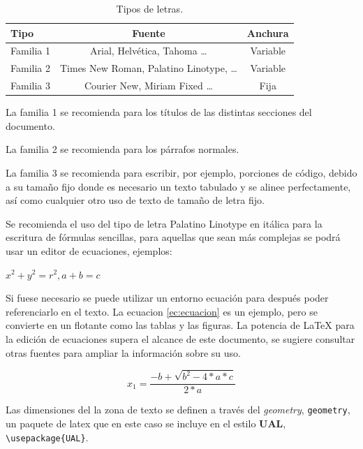 \begin{table} 
	\begin{center}
	\begin{tabular}{l c c}
		\textbf{Tipo} & \textbf{Fuente} & \textbf{Anchura} \\ \hline
         Familia 1 & Arial, Helvética, Tahoma  	\ldots & Variable \\
         Familia 2 & Times New Roman, Palatino  Linotype,  	\ldots & Variable  \\
         Familia 3 & Courier  New,  Miriam Fixed \ldots & Fija \\
         \hline
	\end{tabular}
	\end{center}

	\caption{\label{tab:letras}Tipos de letras.}
\end{table}


La familia 1 se recomienda para los títulos de las distintas secciones del documento.

La familia 2 se recomienda para los párrafos normales.

La familia 3 se recomienda para escribir, por ejemplo, porciones de código, debido a su tamaño fijo donde es necesario un texto tabulado y se alinee perfectamente, así como cualquier otro uso de texto de tamaño de letra fijo.

Se recomienda el uso del tipo de letra Palatino Linotype en itálica para la escritura de fórmulas sencillas, para aquellas que sean más complejas se podrá usar un editor de ecuaciones, ejemplos:

$ x^2+y^2=r^2,    a+b=c$

Si fuese necesario se puede utilizar un entorno ecuación para después poder referenciarlo en el texto. La ecuacion  \ref{ec:ecuacion} es un ejemplo, pero se convierte en un flotante como las tablas y las figuras. La potencia de \LaTeX{} para la edición de ecuaciones supera el alcance de este documento, se sugiere consultar otras fuentes para ampliar la información sobre su uso.

\begin{equation}
\label{ec:ecuacion}
    x_1= \frac{-b+\sqrt{b^2-4*a*c}}{2*a}
\end{equation}




Las dimensiones del la zona de texto se definen a través del \emph{geometry}, \lstinline[language=enparrafo]!geometry!, un paquete de latex que en este caso se incluye en el estilo \textbf{UAL}, \lstinline[language=enparrafo]!\usepackage{UAL}!.

